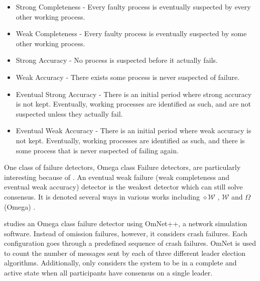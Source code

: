 \begin{itemize}
    \item Strong Completeness - Every faulty process is eventually suspected by
        every other working process.
    \item Weak Completeness - Every faulty process is eventually suspected by 
        some other working process.
    \item Strong Accuracy - No process is suspected before it actually fails.
    \item Weak Accuracy - There exists some process is never suspected of failure.
    \item Eventual Strong Accuracy - There is an initial period where strong
        accuracy is not kept. Eventually, working processes are identified
        as such, and are not suspected unless they actually fail.
    \item Eventual Weak Accuracy - There is an initial period where weak
        accuracy is not kept. Eventually, working processes are identified
        as such, and there is some process that is never suspected of failing
        again.
\end{itemize} 

One class of failure detectors, Omega class Failure detectors, are particularly interesting because of \cite{LEADERELECTIONEVAL}. An eventual weak failure (weak completeness and eventual weak accuracy) detector is the weakest detector which can still solve consensus. It is denoted several ways in various works including $\diamond \mathcal{W}$ \cite{FAILUREDETECTORS}, $\mathcal{W}$ \cite{WEAKESTFAILURE1} \cite{WEAKESTFAILURE2} and $\Omega$ (Omega) \cite{LEADERELECTIONEVAL}.

\cite{LEADERELECTIONEVAL} studies an Omega class failure detector using OmNet++, a network simulation software. Instead of omission failures, however, it considers crash failures. Each configuration goes through a predefined sequence of crash failures. OmNet is used to count the number of messages sent by each of three different leader election algorithms. Additionally, \cite{LEADERELECTIONEVAL} only considers the system to be in a complete and active state when all participants have consensus on a single leader.
